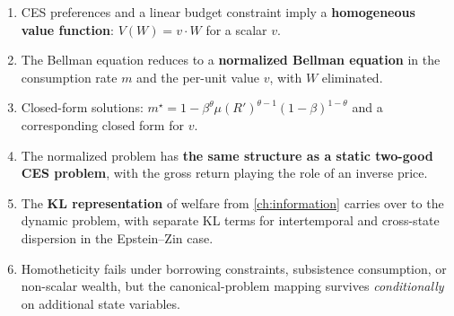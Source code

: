 \begin{calloutimportant}
\begin{enumerate}[label=(\roman*), leftmargin=2em]
    \item CES preferences and a linear budget constraint imply a \textbf{homogeneous value function}: $V(W) = v \cdot W$ for a scalar $v$.
    
    \item The Bellman equation reduces to a \textbf{normalized Bellman equation} in the consumption rate $m$ and the per-unit value $v$, with $W$ eliminated.
    
    \item Closed-form solutions: $m^\star = 1 - \beta^\theta \mu(R')^{\theta-1} (1-\beta)^{1-\theta}$ and a corresponding closed form for $v$.
    
    \item The normalized problem has \textbf{the same structure as a static two-good CES problem}, with the gross return playing the role of an inverse price.
    
    \item The \textbf{KL representation} of welfare from \cref{ch:information} carries over to the dynamic problem, with separate KL terms for intertemporal and cross-state dispersion in the Epstein--Zin case.
    
    \item Homotheticity fails under borrowing constraints, subsistence consumption, or non-scalar wealth, but the canonical-problem mapping survives \emph{conditionally} on additional state variables.
\end{enumerate}
\end{calloutimportant}
